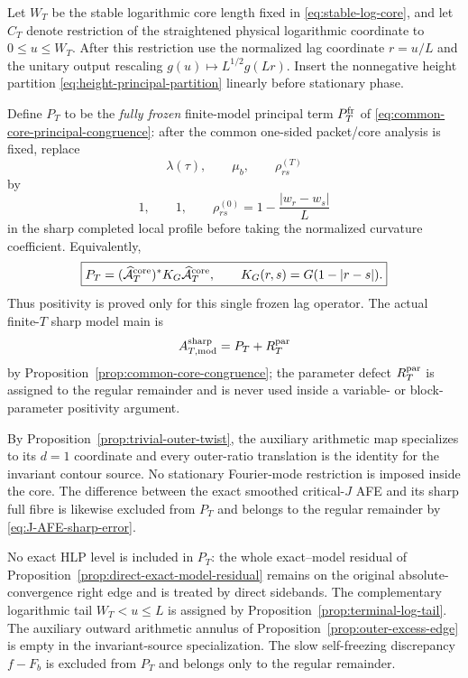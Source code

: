 \begin{definition}
\label{def:PT}
Let $W_T$ be the stable logarithmic core length fixed in
\eqref{eq:stable-log-core}, and let $C_T$ denote restriction of the straightened
physical logarithmic coordinate to $0\le u\le W_T$.  After this restriction use
the normalized lag coordinate $r=u/L$ and the unitary output rescaling
$g(u)\mapsto L^{1/2}g(Lr)$.  Insert the nonnegative height partition
\eqref{eq:height-principal-partition} linearly before stationary phase.

Define $P_T$ to be the \emph{fully frozen} finite-model principal term
$P_T^{\rm fr}$ of \eqref{eq:common-core-principal-congruence}: after the common
one-sided packet/core analysis is fixed, replace
\[
\lambda(\tau),\qquad \mu_b,\qquad
\rho_{rs}^{(T)}
\]
by
\[
1,\qquad1,\qquad
\rho_{rs}^{(0)}=1-\frac{|w_r-w_s|}{L}
\]
in the sharp completed local profile before taking the normalized curvature
coefficient.  Equivalently,
\begin{equation}
\boxed{
P_T=(\widehat{\mathcal A}_T^{\rm core})^*K_G
\widehat{\mathcal A}_T^{\rm core},
\qquad
K_G(r,s)=G(1-|r-s|).
}
\label{eq:PT-frozen-definition}
\end{equation}
Thus positivity is proved only for this single frozen lag operator.  The actual
finite-$T$ sharp model main is
\[
A_{T,\rm mod}^{\rm sharp}=P_T+R_T^{\rm par}
\]
by Proposition~\ref{prop:common-core-congruence}; the parameter defect
$R_T^{\rm par}$ is assigned to the regular remainder and is never used inside
a variable- or block-parameter positivity argument.

By Proposition~\ref{prop:trivial-outer-twist}, the auxiliary arithmetic map
specializes to its $d=1$ coordinate and every outer-ratio translation is the
identity for the invariant contour source.  No stationary Fourier-mode
restriction is imposed inside the core.  The difference between the exact
smoothed critical-$J$ AFE and its sharp full fibre is likewise excluded from
$P_T$ and belongs to the regular remainder by
\eqref{eq:J-AFE-sharp-error}.

No exact HLP level is included in $P_T$: the whole exact--model residual of
Proposition~\ref{prop:direct-exact-model-residual} remains on the original
absolute-convergence right edge and is treated by direct sidebands.  The
complementary logarithmic tail $W_T<u\le L$ is assigned by
Proposition~\ref{prop:terminal-log-tail}.  The auxiliary outward arithmetic
annulus of Proposition~\ref{prop:outer-excess-edge} is empty in the
invariant-source specialization.  The slow self-freezing discrepancy $f-F_b$
is excluded from $P_T$ and belongs only to the regular remainder.
\end{definition}

